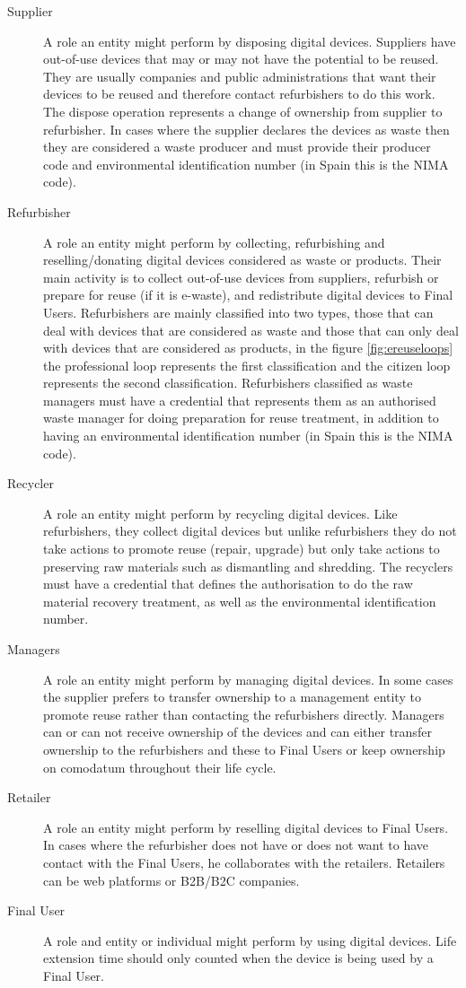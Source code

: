 \documentclass[
]{book}
\begin{document}
\begin{description}
\item[Supplier]
A role an entity might perform by disposing digital devices. Suppliers have out-of-use devices that may or may not have the potential to be reused. They are usually companies and public administrations that want their devices to be reused and therefore contact refurbishers to do this work. The dispose operation represents a change of ownership from supplier to refurbisher. In cases where the supplier declares the devices as waste then they are considered a waste producer and must provide their producer code and environmental identification number (in Spain this is the NIMA code).
\item[Refurbisher]
A role an entity might perform by collecting, refurbishing and reselling/donating digital devices considered as waste or products. Their main activity is to collect out-of-use devices from suppliers, refurbish or prepare for reuse (if it is e-waste), and redistribute digital devices to Final Users. Refurbishers are mainly classified into two types, those that can deal with devices that are considered as waste and those that can only deal with devices that are considered as products, in the figure \ref{fig:ereuseloops} the professional loop represents the first classification and the citizen loop represents the second classification. Refurbishers classified as waste managers must have a credential that represents them as an authorised waste manager for doing preparation for reuse treatment, in addition to having an environmental identification number (in Spain this is the NIMA code).
\item[Recycler]
A role an entity might perform by recycling digital devices. Like refurbishers, they collect digital devices but unlike refurbishers they do not take actions to promote reuse (repair, upgrade) but only take actions to preserving raw materials such as dismantling and shredding. The recyclers must have a credential that defines the authorisation to do the raw material recovery treatment, as well as the environmental identification number.
\item[Managers]
A role an entity might perform by managing digital devices. In some cases the supplier prefers to transfer ownership to a management entity to promote reuse rather than contacting the refurbishers directly. Managers can or can not receive ownership of the devices and can either transfer ownership to the refurbishers and these to Final Users or keep ownership on comodatum throughout their life cycle.
\item[Retailer]
A role an entity might perform by reselling digital devices to Final Users. In cases where the refurbisher does not have or does not want to have contact with the Final Users, he collaborates with the retailers. Retailers can be web platforms or B2B/B2C companies.
\item[Final User]
A role and entity or individual might perform by using digital devices. Life extension time should only counted when the device is being used by a Final User.
\end{description}
\end{document}
